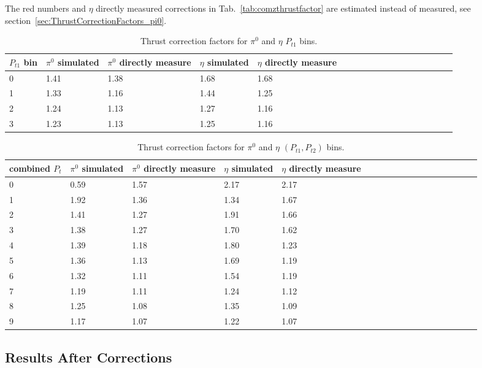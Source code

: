 The red numbers and $\eta$ directly measured corrections in Tab.~\ref{tab:comzthrustfactor} are estimated instead of measured, see section~\ref{sec:ThrustCorrectionFactors_pi0}.
\begin{table}[H]\footnotesize
\centering
\begin{tabular}{|l|l|l|l|l|l|l|l|l|l|l|l|l|l|l|l|l|l|}
\hline
$P_{t1}$ bin & $\pi^0$ simulated & $\pi^0$ directly measure & $\eta$ simulated  & $\eta$ directly measure  \\ \hline
0	&	1.41	&	1.38	&	1.68	&	1.68	\\ \hline
1	&	1.33	&	1.16	&	1.44	&	1.25	\\ \hline
2	&	1.24	&	1.13	&	1.27	&	1.16	\\ \hline
3	&	1.23	&	1.13	&	1.25	&	1.16	\\ \hline
\end{tabular}
\caption{Thrust correction factors for $\pi^0$ and $\eta$ $P_{t1}$ bins.}
\label{tab:sinptthrustfactor_compare}
\end{table}

\begin{table}[H]\footnotesize
\centering
\begin{tabular}{|l|l|l|l|l|l|l|l|l|l|l|l|l|l|l|l|l|l|}
\hline
combined $P_t$ & $\pi^0$ simulated & $\pi^0$ directly measure & $\eta$   simulated  & $\eta$  directly measure  \\ \hline
0	&	0.59	&	1.57	&	2.17	&	2.17	\\ \hline
1	&	1.92	&	1.36	&	1.34	&	1.67	\\ \hline
2	&	1.41	&	1.27	&	1.91	&	1.66	\\ \hline
3	&	1.38	&	1.27	&	1.70	&	1.62	\\ \hline
4	&	1.39	&	1.18	&	1.80	&	1.23	\\ \hline
5	&	1.36	&	1.13	&	1.69	&	1.19	\\ \hline
6	&	1.32	&	1.11	&	1.54	&	1.19	\\ \hline
7	&	1.19	&	1.11	&	1.24	&	1.12	\\ \hline
8	&	1.25	&	1.08	&	1.35	&	1.09	\\ \hline
9	&	1.17	&	1.07	&	1.22	&	1.07	\\ \hline
\end{tabular}
\caption{Thrust correction factors for $\pi^0$ and $\eta$ $(P_{t1},P_{t2})$ bins.}
\label{tab:comptthrustfactor_compare}
\end{table}
\fi


\subsection{Results After Corrections}

